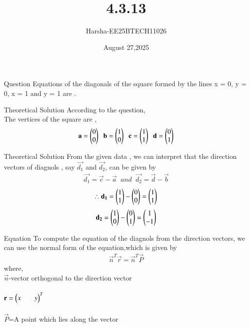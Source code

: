 \documentclass{beamer}
\title %
{4.3.13}
\date{August 27,2025}
\author %
{Harsha-EE25BTECH11026}
\begin{document}
\frame{\titlepage}
\begin{frame}{Question}
Equations of the diagonals of the square formed by the lines x = 0, y = 0, x = 1 and y = 1 are \underline{\hspace{2cm}}.
\end{frame}

\begin{frame}{Theoretical Solution}
According to the question,\\
The vertices of the square are ,
\begin{align*}
    \mathbf{a}=\begin{pmatrix}0\\0\end{pmatrix}\;\;\mathbf{b}=\begin{pmatrix}1\\0\end{pmatrix}\;\;\mathbf{c}=\begin{pmatrix}1\\1\end{pmatrix}\;\;\mathbf{d}=\begin{pmatrix}0\\1\end{pmatrix}
\end{align*}
\end{frame}


\begin{frame}{Theoretical Solution}
From the given data , we can interpret that the direction vectors of diagnols , say $\vec{d_1}$ and $\vec{d_2}$, can be given by 
\begin{align*}
    \vec{d_1}=\vec{c}-\vec{a}\;\;and\;\;\vec{d_2}=\vec{d}-\vec{b}
\end{align*}
\begin{align*}
    \therefore \mathbf{d_1}=\begin{pmatrix}1\\1\end{pmatrix}-\begin{pmatrix}0\\0\end{pmatrix}=\begin{pmatrix}1\\1\end{pmatrix}
\end{align*}
\begin{align*}
    \mathbf{d_2}=\begin{pmatrix}1\\0\end{pmatrix}-\begin{pmatrix}0\\1\end{pmatrix}=\begin{pmatrix}1\\-1\end{pmatrix}
\end{align*}
\end{frame}

\begin{frame}{Equation}
To compute the equation of the diagnols from the direction vectors, we can use the normal form of the equation,which is given by
\begin{align*}
    \vec{n}^T\vec{r}=\vec{n}^T\vec{P}
\end{align*}
where,\\
\hspace*{4em}  $\vec{n}$-vector orthogonal to the direction vector\\
\\
\hspace*{4em}  $\mathbf{r}=\begin{pmatrix}x&&y\end{pmatrix}^T$ \\
\\
\hspace*{4em}  $\vec{P}$=A point which lies along the vector\\
\end{frame}
\end{document}
